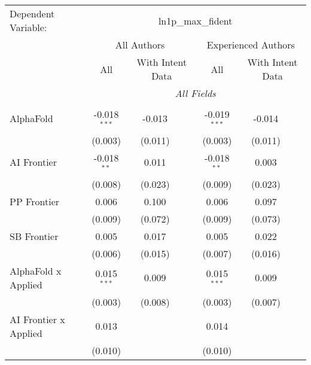 \begingroup
\centering
\begin{tabular}{lcccccc}
   \tabularnewline \midrule \midrule
   Dependent Variable: & \multicolumn{6}{c}{ln1p\_max\_fident}\\
 & \multicolumn{3}{c}{All Authors} & \multicolumn{3}{c}{Experienced Authors} \\
\cmidrule(lr){2-4} \cmidrule(lr){5-7}
 & \multicolumn{1}{c}{All} & \multicolumn{2}{c}{With Intent Data} & \multicolumn{1}{c}{All} & \multicolumn{2}{c}{With Intent Data} \\
\cmidrule(lr){2-2} \cmidrule(lr){3-4} \cmidrule(lr){5-5} \cmidrule(lr){6-7}
 & \multicolumn{6}{c}{\textit{All Fields}} \\ \\
   AlphaFold                      & -0.018$^{***}$ & -0.013  &                & -0.019$^{***}$ & -0.014  &   \\   
                                  & (0.003)        & (0.011) &                & (0.003)        & (0.011) &   \\   
   AI Frontier                    & -0.018$^{**}$  & 0.011   &                & -0.018$^{**}$  & 0.003   &   \\   
                                  & (0.008)        & (0.023) &                & (0.009)        & (0.023) &   \\   
   PP Frontier                    & 0.006          & 0.100   &                & 0.006          & 0.097   &   \\   
                                  & (0.009)        & (0.072) &                & (0.009)        & (0.073) &   \\   
   SB Frontier                    & 0.005          & 0.017   &                & 0.005          & 0.022   &   \\   
                                  & (0.006)        & (0.015) &                & (0.007)        & (0.016) &   \\   
   AlphaFold x Applied            & 0.015$^{***}$  & 0.009   &                & 0.015$^{***}$  & 0.009   &   \\   
                                  & (0.003)        & (0.008) &                & (0.003)        & (0.007) &   \\   
   AI Frontier x Applied          & 0.013          &         &                & 0.014          &         &   \\   
                                  & (0.010)        &         &                & (0.010)        &         &   \\   

\end{tabular}

